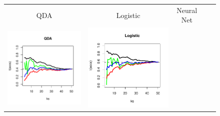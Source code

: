 \documentclass{article}
\begin{document}
\begin{figure}
\centering
\begin{tabular}{cccrl}
QDA & Logistic & Neural Net & \\
\multirow{5}{*}{\includegraphics[scale = 0.5, clip=true, trim=0.2in 0.6in 0.2in 0.7in]{../extrapolation/sim_qda.pdf}} &
\multirow{5}{*}{\includegraphics[scale = 0.5, clip=true, trim=0.75in 0.6in 0.2in 0.7in]{../extrapolation/sim_glmnet.pdf}} & 

\end{tabular}
\end{figure}
\end{document}
